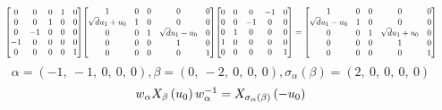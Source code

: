 \documentclass[11pt]{article}
\theoremstyle{definition}
\begin{document}
\[
\scaletoalign{\textwidth}{{\left[\begin{matrix}0 & 0 & 0 & 1 & 0\\0 & 0 & 1 & 0 & 0\\0 & -1 & 0 & 0 & 0\\-1 & 0 & 0 & 0 & 0\\0 & 0 & 0 & 0 & 1\end{matrix}\right]} {\left[\begin{matrix}1 & 0 & 0 & 0 & 0\\\sqrt{d} u_{1} + u_{0} & 1 & 0 & 0 & 0\\0 & 0 & 1 & \sqrt{d} u_{1} - u_{0} & 0\\0 & 0 & 0 & 1 & 0\\0 & 0 & 0 & 0 & 1\end{matrix}\right]} {\left[\begin{matrix}0 & 0 & 0 & -1 & 0\\0 & 0 & -1 & 0 & 0\\0 & 1 & 0 & 0 & 0\\1 & 0 & 0 & 0 & 0\\0 & 0 & 0 & 0 & 1\end{matrix}\right]} = {\left[\begin{matrix}1 & 0 & 0 & 0 & 0\\\sqrt{d} u_{1} - u_{0} & 1 & 0 & 0 & 0\\0 & 0 & 1 & \sqrt{d} u_{1} + u_{0} & 0\\0 & 0 & 0 & 1 & 0\\0 & 0 & 0 & 0 & 1\end{matrix}\right]}}
\]
\[
\alpha = \left( -1, \  -1, \  0, \  0, \  0\right), \beta = \left( 0, \  -2, \  0, \  0, \  0\right), \sigma_{\alpha}(\beta) = \left( 2, \  0, \  0, \  0, \  0\right)
\]
\[
\scaletoalign{\textwidth}{w_{\alpha} X_{\beta}\left(u_{0}\right) w_{\alpha}^{-1} = X_{\sigma_{\alpha}\left(\beta\right)}\left(- u_{0}\right)}
\]
\end{document}

